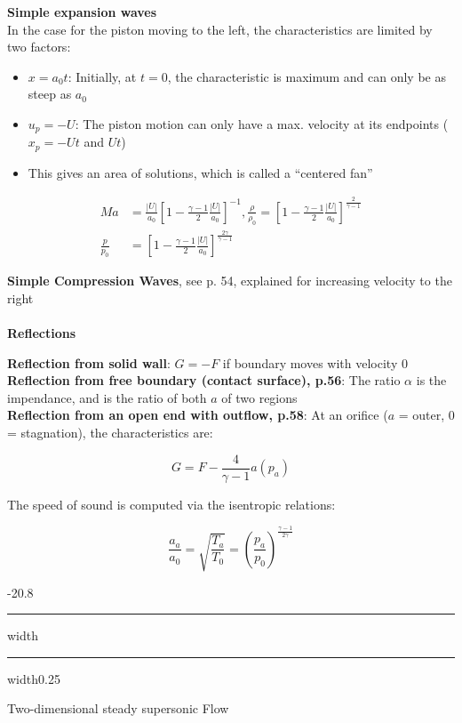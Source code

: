\documentclass[8pt, landscape, fleqn]{scrartcl}
\makeatletter
\renewcommand{\section}{\@startsection{section}{1}{0mm}%
{-2\baselineskip}{0.8\baselineskip}%
{\hrule depth 0.2pt width\columnwidth\hrule depth1.5pt
width0.25\columnwidth\vspace*{1.2em}\Large\bfseries\rmfamily}}
\makeatother
\begin{document}
\begin{multicols*}{3}
\textbf{Simple expansion waves} \\
In the case for the piston moving to the left, the characteristics are limited by two factors:

\begin{itemize}
    \item $x=a_0 t$: Initially, at $t=0$, the characteristic is maximum and can only be as steep as $a_0$
    \item $u_p=-U$: The piston motion can only have a max. velocity at its endpoints ($x_p = -Ut$ and $Ut$)
    \item This gives an area of solutions, which is called a ``centered fan''
\end{itemize}
\begin{align*}
    Ma &= \frac{|U|}{a_0} \left[ 1- \frac{\gamma -1}{2} \frac{|U|}{a_0} \right]^{-1},
    \frac{\rho}{\rho_0} = \left[ 1- \frac{\gamma-1}{2} \frac{|U|}{a_0} \right]^{\frac{2}{\gamma-1}} \\
    \frac{p}{p_0} &= \left[ 1- \frac{\gamma-1}{2} \frac{|U|}{a_0} \right]^{\frac{2 \gamma}{\gamma-1}}
\end{align*}

\textbf{Simple Compression Waves},
see p. 54, explained for increasing velocity to the right \\ \\ 
\textbf{Reflections}

\textbf{Reflection from solid wall}: $G=-F$ if boundary moves with velocity $0$ \\

\textbf{Reflection from free boundary (contact surface), p.56}: The ratio $\alpha$ is the impendance, and is the ratio of both $a$ of two regions \\

\textbf{Reflection from an open end with outflow, p.58}: At an orifice ($a$ = outer, $0$ = stagnation), the characteristics are:

\begin{equation*}
    G = F - \frac{4}{\gamma-1} a(p_a)
\end{equation*}

The speed of sound is computed via the isentropic relations:

\begin{equation*}
    \frac{a_a}{a_0} = \sqrt{\frac{T_a}{T_0}} = \left( \frac{p_a}{p_0} \right)^{\frac{\gamma-1}{2\gamma}}
\end{equation*}


\section{Two-dimensional steady supersonic Flow}




\end{multicols*}
\end{document}
